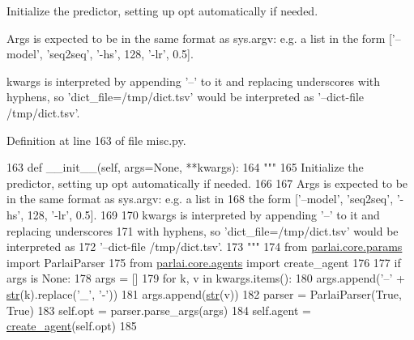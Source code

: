 \begin{DoxyVerb}Initialize the predictor, setting up opt automatically if needed.

Args is expected to be in the same format as sys.argv: e.g. a list in
the form ['--model', 'seq2seq', '-hs', 128, '-lr', 0.5].

kwargs is interpreted by appending '--' to it and replacing underscores
with hyphens, so 'dict_file=/tmp/dict.tsv' would be interpreted as
'--dict-file /tmp/dict.tsv'.
\end{DoxyVerb}
 

Definition at line 163 of file misc.\+py.


\begin{DoxyCode}
163     \textcolor{keyword}{def }\_\_init\_\_(self, args=None, **kwargs):
164         \textcolor{stringliteral}{"""}
165 \textcolor{stringliteral}{        Initialize the predictor, setting up opt automatically if needed.}
166 \textcolor{stringliteral}{}
167 \textcolor{stringliteral}{        Args is expected to be in the same format as sys.argv: e.g. a list in}
168 \textcolor{stringliteral}{        the form ['--model', 'seq2seq', '-hs', 128, '-lr', 0.5].}
169 \textcolor{stringliteral}{}
170 \textcolor{stringliteral}{        kwargs is interpreted by appending '--' to it and replacing underscores}
171 \textcolor{stringliteral}{        with hyphens, so 'dict\_file=/tmp/dict.tsv' would be interpreted as}
172 \textcolor{stringliteral}{        '--dict-file /tmp/dict.tsv'.}
173 \textcolor{stringliteral}{        """}
174         \textcolor{keyword}{from} \hyperlink{namespaceparlai_1_1core_1_1params}{parlai.core.params} \textcolor{keyword}{import} ParlaiParser
175         \textcolor{keyword}{from} \hyperlink{namespaceparlai_1_1core_1_1agents}{parlai.core.agents} \textcolor{keyword}{import} create\_agent
176 
177         \textcolor{keywordflow}{if} args \textcolor{keywordflow}{is} \textcolor{keywordtype}{None}:
178             args = []
179         \textcolor{keywordflow}{for} k, v \textcolor{keywordflow}{in} kwargs.items():
180             args.append(\textcolor{stringliteral}{'--'} + \hyperlink{namespacegenerate__task__READMEs_a5b88452ffb87b78c8c85ececebafc09f}{str}(k).replace(\textcolor{stringliteral}{'\_'}, \textcolor{stringliteral}{'-'}))
181             args.append(\hyperlink{namespacegenerate__task__READMEs_a5b88452ffb87b78c8c85ececebafc09f}{str}(v))
182         parser = ParlaiParser(\textcolor{keyword}{True}, \textcolor{keyword}{True})
183         self.opt = parser.parse\_args(args)
184         self.agent = \hyperlink{namespaceparlai_1_1core_1_1agents_a00d77a7e26fb89e8bd900f7b2a02982a}{create\_agent}(self.opt)
185 
\end{DoxyCode}



